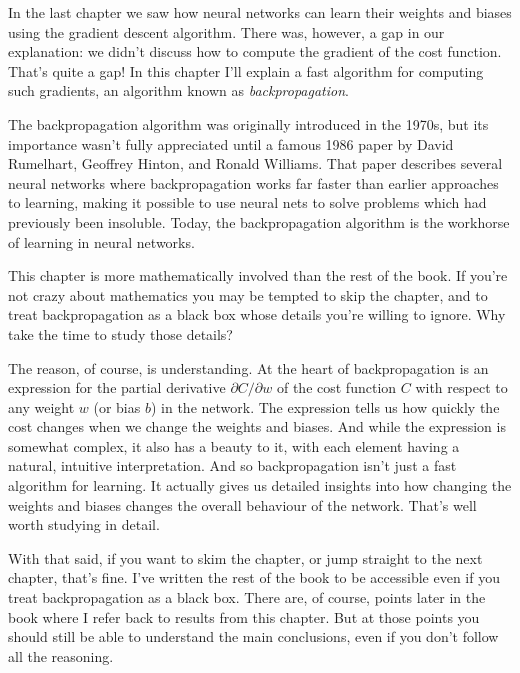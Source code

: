 
In the last chapter we saw how neural networks can learn their weights and biases using the gradient descent algorithm. There was, however, a gap in our explanation: we didn't discuss how to compute the gradient of the cost function. That's quite a gap! In this chapter I'll explain a fast algorithm for computing such gradients, an algorithm known as \emph{backpropagation}.


The backpropagation algorithm was originally introduced in the 1970s, but its importance wasn't fully appreciated until a famous 1986 paper by David Rumelhart, Geoffrey Hinton, and Ronald Williams. That paper describes several neural networks where backpropagation works far faster than earlier approaches to learning, making it possible to use neural nets to solve problems which had previously been insoluble. Today, the backpropagation algorithm is the workhorse of learning in neural networks.


This chapter is more mathematically involved than the rest of the book. If you're not crazy about mathematics you may be tempted to skip the chapter, and to treat backpropagation as a black box whose details you're willing to ignore. Why take the time to study those details?


The reason, of course, is understanding. At the heart of backpropagation is an expression for the partial derivative $\partial C / \partial w$ of the cost function $C$ with respect to any weight $w$ (or bias $b$) in the network. The expression tells us how quickly the cost changes when we change the weights and biases. And while the expression is somewhat complex, it also has a beauty to it, with each element having a natural, intuitive interpretation. And so backpropagation isn't just a fast algorithm for learning. It actually gives us detailed insights into how changing the weights and biases changes the overall behaviour of the network. That's well worth studying in detail.


With that said, if you want to skim the chapter, or jump straight to the next chapter, that's fine. I've written the rest of the book to be accessible even if you treat backpropagation as a black box. There are, of course, points later in the book where I refer back to results from this chapter. But at those points you should still be able to understand the main conclusions, even if you don't follow all the reasoning.





